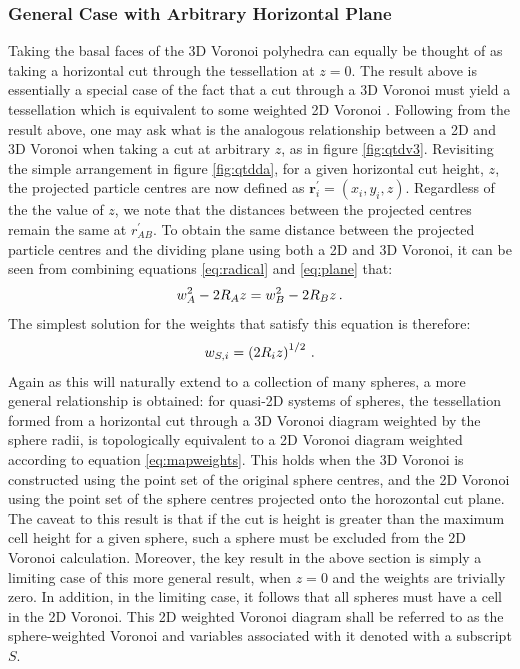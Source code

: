 \subsubsection{General Case with Arbitrary Horizontal Plane}

Taking the basal faces of the 3D Voronoi polyhedra can equally be thought of as taking a horizontal cut through the tessellation at $z=0$.
The result above is essentially a special case of the fact that a cut through a 3D Voronoi must yield a tessellation which is equivalent to some weighted 2D Voronoi \cite{Imai1985,Rivier1990}.
Following from the result above, one may ask what is the analogous relationship between a 2D and 3D Voronoi when taking a cut at arbitrary $z$, as in figure \ref{fig:qtdv3}.
Revisiting the simple arrangement in figure \ref{fig:qtdda}, for a given horizontal cut height, $z$, the projected particle centres are now defined as $\mathbf{r}_i^\prime=\left(x_i,y_i,z\right)$.
Regardless of the the value of $z$, we note that the distances between the projected centres remain the same at $r_{AB}^\prime$.
To obtain the same distance between the projected particle centres and the dividing plane using both a 2D and 3D Voronoi, it can be seen from combining equations \eqref{eq:radical} and \eqref{eq:plane} that:
\begin{equation}
	\label{eq:condition}
	w_A^2-2R_Az = w_B^2-2R_Bz\,.
\end{equation}
The simplest solution for the weights that satisfy this equation is therefore:
\begin{equation}
	\label{eq:mapweights}
	w_{S,i} = \left(2R_iz\right)^{1/2}\,.
\end{equation}
Again as this will naturally extend to a collection of many spheres, a more general relationship is obtained: for quasi\--2D systems of spheres, the tessellation formed from a horizontal cut through a 3D Voronoi diagram weighted by the sphere radii, is topologically equivalent to a 2D Voronoi diagram weighted according to equation \eqref{eq:mapweights}.
This holds when the 3D Voronoi is constructed using the point set of the original sphere centres, and the 2D Voronoi using the point set of the sphere centres projected onto the horozontal cut plane. 
The caveat to this result is that if the cut is height is greater than the maximum cell height for a given sphere, such a sphere must be excluded from the 2D Voronoi calculation.
Moreover, the key result in the above section is simply a limiting case of this more general result, when $z = 0$ and the weights are trivially zero. 
In addition, in the limiting case, it follows that all spheres must have a cell in the 2D Voronoi.
This 2D weighted Voronoi diagram shall be referred to as the sphere\--weighted Voronoi and variables associated with it denoted with a subscript $S$.

